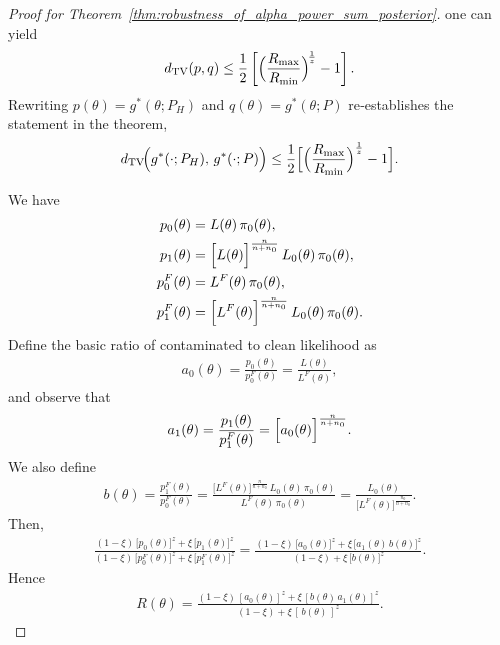 \documentclass[12pt]{article}
\begin{document}
\begin{proof}[Proof for Theorem~\ref{thm:robustness_of_alpha_power_sum_posterior}]
    one can yield
    \begin{align*}
        d_{\mathrm{TV}}(p,q) \leq \frac12\left[\Bigl(\frac{R_{\max}}{R_{\min}}\Bigr)^{\!\frac1z} -1 \right].
    \end{align*}
    Rewriting $p(\theta)=g^*(\theta;P_H)$ and $q(\theta)=g^*(\theta;P)$ re‐establishes the statement in the theorem,
    \begin{align*}
        d_{\mathrm{TV}}\!\Bigl(g^*(\cdot;P_H),\,g^*(\cdot;P)\Bigr) \leq  \frac12\Bigl[\Bigl(\frac{R_{\max}}{R_{\min}}\Bigr)^{\frac{1}{z}} - 1\Bigr].
    \end{align*}
    
    We have
    \begin{align*}
        p_0(\theta) &= L(\theta)\,\pi_0(\theta), \\
        p_1(\theta) &= \Bigl[L(\theta)\Bigr]^{\frac{n}{n+n_0}}\,L_0(\theta)\,\pi_0(\theta), \\
        p_0^F(\theta) &= L^F(\theta)\,\pi_0(\theta), \\
        p_1^F(\theta) &= \Bigl[L^F(\theta)\Bigr]^{\frac{n}{n+n_0}}\,L_0(\theta)\,\pi_0(\theta).
    \end{align*}
    Define the basic ratio of contaminated to clean likelihood as
    \begin{align*}
        a_0(\theta) = \frac{p_0(\theta)}{p_0^F(\theta)} = \frac{L(\theta)}{L^F(\theta)},
    \end{align*}
    and observe that
    \begin{align*}
        a_1(\theta) = \frac{p_1(\theta)}{p_1^F(\theta)} = \Bigl[a_0(\theta)\Bigr]^{\frac{n}{n+n_0}}.
    \end{align*}
    We also define
    \begin{align*}
        b(\theta) = \frac{p_1^F(\theta)}{p_0^F(\theta)} = \frac{\bigl[L^F(\theta)\bigr]^{\frac{n}{n+n_0}}\,L_0(\theta)\,\pi_0(\theta)}{L^F(\theta)\,\pi_0(\theta)} = \frac{L_0(\theta)}{\bigl[L^F(\theta)\bigr]^{\frac{n_0}{n+n_0}}}.
    \end{align*}
    Then,
    \begin{align*}
        \frac{(1-\xi)\,\bigl[p_0(\theta)\bigr]^z + \xi\,\bigl[p_1(\theta)\bigr]^z}{(1-\xi)\,\bigl[p_0^F(\theta)\bigr]^z + \xi\,\bigl[p_1^F(\theta)\bigr]^z} = \frac{(1-\xi)\,\bigl[a_0(\theta)\bigr]^z + \xi\,\bigl[a_1(\theta)\,b(\theta)\bigr]^z}{(1-\xi) + \xi\,\bigl[b(\theta)\bigr]^z}.
    \end{align*}
    Hence
    \begin{align*}
        R(\theta) = \frac{(1-\xi)\,[a_0(\theta)]^z + \xi\,[b(\theta)\,a_1(\theta)]^z}{(1-\xi) + \xi\,[\,b(\theta)\,]^z}.

\end{align*}
\end{proof}
\end{document}
